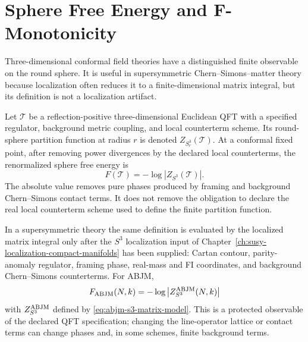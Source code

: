 \section{Sphere Free Energy and F-Monotonicity}
\label{sec:three-d-sphere-free-energy-f-theorem}

Three-dimensional conformal field theories have a distinguished finite
observable on the round sphere.  It is useful in supersymmetric
Chern--Simons--matter theory because localization often reduces it to a
finite-dimensional matrix integral, but its definition is not a localization
artifact.

\begin{definition}
\label{def:renormalized-s3-free-energy}
Let \(\mathcal T\) be a reflection-positive three-dimensional Euclidean QFT
with a specified regulator, background metric coupling, and local
counterterm scheme.  Its round-sphere partition function at radius \(r\) is
denoted \(Z_{S^3_r}(\mathcal T)\).  At a conformal fixed point, after
removing power divergences by the declared local counterterms, the
renormalized sphere free energy is
\begin{equation}
  F(\mathcal T)
  =
  -\log\left|Z_{S^3}(\mathcal T)\right|.
  \label{eq:s3-free-energy-definition}
\end{equation}
The absolute value removes pure phases produced by framing and background
Chern--Simons contact terms.  It does not remove the obligation to declare
the real local counterterm scheme used to define the finite partition
function.
\end{definition}

In a supersymmetric theory the same definition is evaluated by the localized
matrix integral only after the \(S^3\) localization input of
Chapter~\ref{ch:susy-localization-compact-manifolds} has been supplied:
Cartan contour, parity-anomaly regulator, framing phase, real-mass and FI
coordinates, and background Chern--Simons counterterms.  For ABJM,
\begin{equation}
  F_{\rm ABJM}(N,k)
  =
  -\log\left|Z^{\rm ABJM}_{S^3}(N,k)\right|
  \label{eq:abjm-sphere-free-energy}
\end{equation}
with \(Z^{\rm ABJM}_{S^3}\) defined by
\eqref{eq:abjm-s3-matrix-model}.  This is a protected observable of the
declared QFT specification; changing the line-operator lattice or contact terms can
change phases and, in some schemes, finite background terms.

